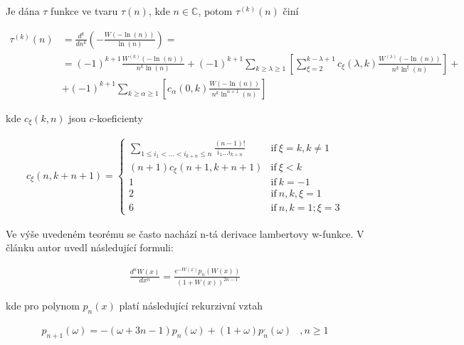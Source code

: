 \begin{theorem}
      Je dána \(\tau\) funkce ve tvaru \(\tau(n)\), kde
      \(n \in \mathbb{C}\), potom \(\tau^{(k)}(n)\) činí
      
      \begin{align}
            \tau^{(k)}(n) &= \frac{d^k}{dn^k}\left(  
            -\frac{W(-\ln(n))}{\ln(n)} \right) = \\
            & = (-1)^{k+1}   \frac{W^{(k)}(-\ln(n))}{n^k 
            \ln(n)} + (-1)^{k+1}\sum_{k \geq \lambda \geq 
            1} \left[ \sum_{\xi = 2}^{k - \lambda +1}c_{\xi}(\lambda, 
            k) \frac{W^{(\lambda)}(-\ln(n))}{n^k \ln^\xi (n)}  \right] 
            + \\ &+ (-1)^{k+1}\sum_{k \geq \alpha \geq 1} \left[
            c_{\alpha}(0, k) \frac{W(-\ln(n))}{n^k \ln^{\alpha+1}(n)} \right]
      \end{align}
      
      kde \(c_{\xi}(k, n)\) jsou \(c\)-koeficienty

      \begin{align}
            c_{\xi}(n, k+n+1) =\left\{ 
            \begin{array}{ll}
                  \sum_{1 \leq i_1 < ... < i_{k+n} \leq n}\frac{(n-1)!}{i_1
                  ... i_{k+n}}  &\mbox{if} \  \xi = k, k\neq 1\\
                  (n+1) c_{\xi}(n+1, k+n+1) &\mbox{if} \  \xi < k\\
                  1 & \mbox{if} \ k=-1 \\
                  2 & \mbox{if} \ n, k, \xi =1 \\
                  6 & \mbox{if} \ n, k = 1; \xi = 3
            \end{array}  \right.
      \end{align}
\end{theorem}

Ve výše uvedeném teorému se často nachází n-tá derivace 
lambertovy w-funkce. V článku  \cite{31} autor uvedl následující formuli:

\begin{align}
      \frac{d^n W(x)}{dx^n} = 
      \frac{e^{-W(x)}p_n(W(x))}{(1+W(x))^{2n-1}}
\end{align}

kde pro polynom \(p_n(x)\) platí následující rekurzivní vztah

\begin{align}
      p_{n+1}(\omega) = - (\omega + 3 n - 1) p_n 
      (\omega) + (1+ \omega)p^,_n(\omega) &, n \geq 1
\end{align}

